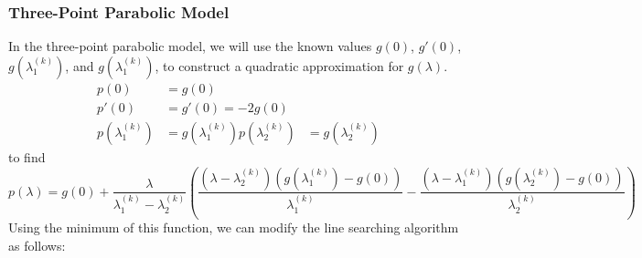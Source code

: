 \documentclass{article}
\begin{document}
\subsubsection{Three-Point Parabolic Model}
In the three-point parabolic model, we will use the known values
\(g\left( 0 \right)\), \(g'\left( 0 \right)\), \(g\left(
\lambda_1^{\left( k \right)} \right)\), and \(g\left( \lambda_1^{\left(
k \right)} \right)\), to construct a quadratic approximation for
\(g\left( \lambda \right)\).
\begin{align*}
    p\left( 0 \right)                            & = g\left( 0 \right)                            \\
    p'\left( 0 \right)                           & = g'\left( 0 \right) = -2 g\left( 0 \right)    \\
    p\left( \lambda_1^{\left( k \right)} \right) & = g\left( \lambda_1^{\left( k \right)} \right)
    p\left( \lambda_2^{\left( k \right)} \right) & = g\left( \lambda_2^{\left( k \right)} \right)
\end{align*}
to find
\begin{equation*}
    p\left( \lambda \right) = g\left( 0 \right) + \frac{\lambda}{\lambda_1^{\left( k \right)} - \lambda_2^{\left( k \right)}} \left( \frac{\left(  \lambda - \lambda_2^{\left( k \right)} \right) \left( g\left( \lambda_1^{\left( k \right)} \right) - g\left( 0 \right) \right)}{\lambda_1^{\left( k \right)}} - \frac{\left( \lambda - \lambda_1^{\left( k \right)} \right) \left( g\left( \lambda_2^{\left( k \right)} \right) - g\left( 0 \right) \right)}{\lambda_2^{\left( k \right)}} \right)
\end{equation*}
Using the minimum of this function, we can modify the line searching
algorithm as follows:
\end{document}
